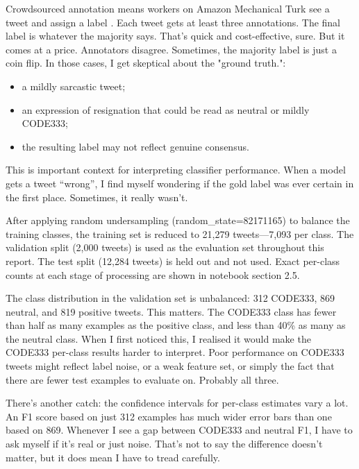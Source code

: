 \documentclass[12pt]{article}
\begin{document}
Crowdsourced annotation means workers on Amazon Mechanical Turk see a tweet and assign a label \citep{rosenthal2017semeval}. Each tweet gets at least three annotations. The final label is whatever the majority says. That's quick and cost-effective, sure. But it comes at a price. Annotators disagree. Sometimes, the majority label is just a coin flip. In those cases, I get skeptical about the "ground truth.":

\begin{itemize}

  \item a mildly sarcastic tweet;

  \item an expression of resignation that could be read as neutral or mildly CODE333;

  \item the resulting label may not reflect genuine consensus.

\end{itemize}



This is important context for interpreting classifier performance. When a model gets a tweet ``wrong'', I find myself wondering if the gold label was ever certain in the first place. Sometimes, it really wasn't.



After applying random undersampling (random_state=82171165) to balance the training classes, the training set is reduced to 21,279 tweets—7,093 per class. The validation split (2,000 tweets) is used as the evaluation set throughout this report. The test split (12,284 tweets) is held out and not used. Exact per-class counts at each stage of processing are shown in notebook section 2.5.



The class distribution in the validation set is unbalanced: 312 CODE333, 869 neutral, and 819 positive tweets. This matters. The CODE333 class has fewer than half as many examples as the positive class, and less than 40\% as many as the neutral class. When I first noticed this, I realised it would make the CODE333 per-class results harder to interpret. Poor performance on CODE333 tweets might reflect label noise, or a weak feature set, or simply the fact that there are fewer test examples to evaluate on. Probably all three.



There's another catch: the confidence intervals for per-class estimates vary a lot. An F1 score based on just 312 examples has much wider error bars than one based on 869. Whenever I see a gap between CODE333 and neutral F1, I have to ask myself if it's real or just noise. That's not to say the difference doesn't matter, but it does mean I have to tread carefully.
\end{document}
